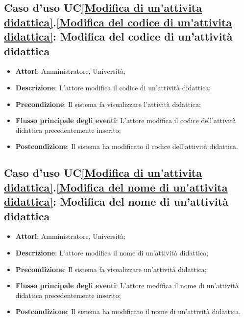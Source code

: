 \subsection{Caso d'uso UC\ref{Modifica di un'attivita didattica}.\ref{Modifica del codice di un'attivita didattica}: Modifica del codice di un'attività didattica}
\begin{itemize}
	\item \textbf{Attori}: Amministratore, Università;
	\item \textbf{Descrizione}: L'attore modifica il codice di un'attività didattica;
	
	\item \textbf{Precondizione}: Il sistema fa visualizzare l'attività didattica;
	
	\item \textbf{Flusso principale degli eventi}: L'attore modifica il codice dell'attività didattica precedentemente inserito;
	
	\item \textbf{Postcondizione}: Il sistema ha modificato il codice dell'attività didattica.
	
\end{itemize}

\subsection{Caso d'uso UC\ref{Modifica di un'attivita didattica}.\ref{Modifica del nome di un'attivita didattica}: Modifica del nome di un'attività didattica}
\begin{itemize}
	\item \textbf{Attori}: Amministratore, Università;
	\item \textbf{Descrizione}: L'attore modifica il nome di un'attività didattica;
	
	\item \textbf{Precondizione}: Il sistema fa visualizzare un'attività didattica;
	
	
	\item \textbf{Flusso principale degli eventi}: L'attore modifica il nome di un'attività didattica precedentemente inserito;
	
	\item \textbf{Postcondizione}: Il sistema ha modificato il nome di un'attività didattica.
	
\end{itemize}

